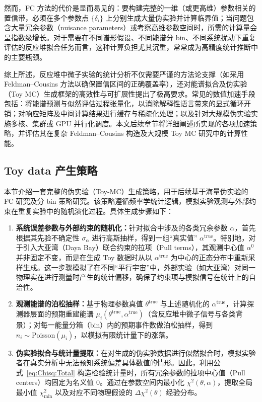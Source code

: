 然而，FC 方法的代价是显而易见的：要构建完整的一维（或更高维）参数相关的置信带，必须在多个参数点 $\{\delta_i\}$ 上分别生成大量伪实验并计算临界值；当问题包含大量冗余参数（nuisance parameters）或考察高维参数空间时，所需的计算量会呈指数级增长。对于需要在不同谱形假设、不同能谱分 bin、不同系统扰动下重复评估的反应堆拟合任务而言，这种计算负担尤其沉重，常常成为高精度统计推断中的主要瓶颈。

综上所述，反应堆中微子实验的统计分析不仅需要严谨的方法论支撑（如采用 Feldman--Cousins 方法以确保置信区间的正确覆盖率），还对能谱拟合及伪实验（Toy MC）生成框架的高效性与可扩展性提出了极高要求。常见的数值加速手段包括：将能谱预测与似然评估过程张量化，以消除解释性语言带来的显式循环开销；对响应矩阵及中间计算结果进行缓存与稀疏化处理；以及针对大规模伪实验实施多核、集群或 GPU 并行化调度。本文后续章节将详细阐述所实现的各项加速策略，并评估其在复杂 Feldman--Cousins 构造及大规模 Toy MC 研究中的计算性能。

\subsection{Toy data 产生策略}
\label{sec:Toy-MC}
本节介绍一套完整的伪实验（Toy-MC）生成策略，用于后续基于海量伪实验的 FC 研究及分 bin 策略研究。该策略遵循频率学统计逻辑，模拟实验观测与外部约束在重复实验中的随机演化过程。具体生成步骤如下：
\begin{enumerate}[nosep]
  \item \textbf{系统误差参数与外部约束的随机化：}针对拟合中涉及的各类冗余参数 $\alpha$，首先根据其先验不确定性 $\sigma_{\alpha}$ 进行高斯抽样，得到一组“真实值” $\alpha^{\text{true}}$。特别地，对于引入大亚湾（Daya Bay）联合约束的拉项（Pull terms），其观测中心值 $\alpha^0$ 并非固定不变，而是在生成 Toy 数据时从以 $\alpha^{\text{true}}$ 为中心的正态分布中重新采样生成。这一步骤模拟了在不同“平行宇宙”中，外部实验（如大亚湾）对同一物理实在进行测量时产生的统计偏移，确保了约束项与模拟信号在统计上的自洽性。

  \item \textbf{观测能谱的泊松抽样：}基于物理参数真值 $\theta^{\text{true}}$ 与上述随机化的 $\alpha^{\text{true}}$，计算探测器层面的预期重建能谱 $\mu_i(\theta^{\text{true}}, \alpha^{\text{true}})$（含反应堆中微子信号与各类背景）；对每一能量分箱（bin）内的预期事件数做泊松抽样，得到 $n_i \sim \text{Poisson}(\mu_i)$，以模拟有限统计量下的涨落。

  \item \textbf{伪实验拟合与统计量提取：}在对生成的伪实验数据进行似然拟合时，模拟实验者在真实分析中无法预知系统偏差具体数值的情形。因此，利用公式~\eqref{eq:Chisq:Total} 构造检验统计量时，所有冗余参数的拉项中心值（Pull centers）均固定为名义值 $0$。通过在参数空间内最小化 $\chi^2(\theta, \alpha)$，提取全局最小值 $\chi^2_{\min}$ 以及对应不同物理假设的 $\Delta\chi^2(\theta)$ 经验分布。
\end{enumerate}

